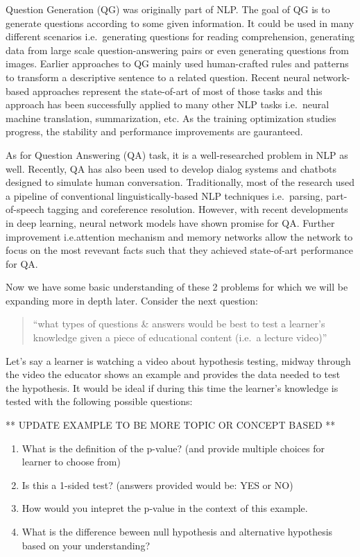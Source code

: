 \documentclass[]{book}
\theoremstyle{definition}
\theoremstyle{definition}
\theoremstyle{definition}
\theoremstyle{remark}
\begin{document}
Question Generation (QG) was originally part of NLP. The goal of QG is
to generate questions according to some given information. It could be
used in many different scenarios i.e.~generating questions for reading
comprehension, generating data from large scale question-answering pairs
or even generating questions from images. Earlier approaches to QG
mainly used human-crafted rules and patterns to transform a descriptive
sentence to a related question. Recent neural network-based approaches
represent the state-of-art of most of those tasks and this approach has
been successfully applied to many other NLP tasks i.e.~neural machine
translation, summarization, etc. As the training optimization studies
progress, the stability and performance improvements are gauranteed.

As for Question Answering (QA) task, it is a well-researched problem in
NLP as well. Recently, QA has also been used to develop dialog systems
and chatbots designed to simulate human conversation. Traditionally,
most of the research used a pipeline of conventional
linguistically-based NLP techniques i.e.~parsing, part-of-speech tagging
and coreference resolution. However, with recent developments in deep
learning, neural network models have shown promise for QA. Further
improvement i.e.attention mechanism and memory networks allow the
network to focus on the most revevant facts such that they achieved
state-of-art performance for QA.

Now we have some basic understanding of these 2 problems for which we
will be expanding more in depth later. Consider the next question:

\begin{quote}
``what types of questions \& answers would be best to test a learner's
knowledge given a piece of educational content (i.e.~a lecture video)''
\end{quote}

Let's say a learner is watching a video about hypothesis testing, midway
through the video the educator shows an example and provides the data
needed to test the hypothesis. It would be ideal if during this time the
learner's knowledge is tested with the following possible questions:

** UPDATE EXAMPLE TO BE MORE TOPIC OR CONCEPT BASED **

\begin{enumerate}
\def\labelenumi{\arabic{enumi}.}
\item
  What is the definition of the p-value? (and provide multiple choices
  for learner to choose from)
\item
  Is this a 1-sided test? (answers provided would be: YES or NO)
\item
  How would you intepret the p-value in the context of this example.
\item
  What is the difference beween null hypothesis and alternative
  hypothesis based on your understanding?
\end{enumerate}
\end{document}
